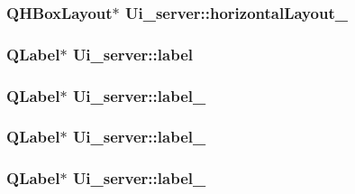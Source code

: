 \hypertarget{classUi__server_aa46f2b9b91e96c997795f67d35120289}{
\subsubsection[{horizontal\-Layout\-\_\-3}]{\setlength{\rightskip}{0pt plus 5cm}Q\-H\-Box\-Layout$\ast$ Ui\-\_\-server\-::horizontal\-Layout\-\_}}\label{classUi__server_aa46f2b9b91e96c997795f67d35120289}
\hypertarget{classUi__server_a965352bb6187d932f0fada586670e6b8}{
\subsubsection[{label}]{\setlength{\rightskip}{0pt plus 5cm}Q\-Label$\ast$ Ui\-\_\-server\-::label}}\label{classUi__server_a965352bb6187d932f0fada586670e6b8}
\hypertarget{classUi__server_a58fc60a6778156dd9d740d0306805bed}{
\subsubsection[{label\-\_\-2}]{\setlength{\rightskip}{0pt plus 5cm}Q\-Label$\ast$ Ui\-\_\-server\-::label\-\_}}\label{classUi__server_a58fc60a6778156dd9d740d0306805bed}
\hypertarget{classUi__server_a9f0a4034a058c8cb337d3bf29175076c}{
\subsubsection[{label\-\_\-3}]{\setlength{\rightskip}{0pt plus 5cm}Q\-Label$\ast$ Ui\-\_\-server\-::label\-\_}}\label{classUi__server_a9f0a4034a058c8cb337d3bf29175076c}
\hypertarget{classUi__server_aabf48ff690d1ceff2eaf6f0b6ca06007}{
\subsubsection[{label\-\_\-4}]{\setlength{\rightskip}{0pt plus 5cm}Q\-Label$\ast$ Ui\-\_\-server\-::label\-\_}}\label{classUi__server_aabf48ff690d1ceff2eaf6f0b6ca06007}
